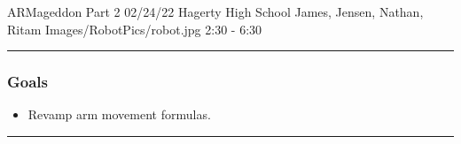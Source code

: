 \insertmeeting 
	{ARMageddon Part 2} 
	{02/24/22} 
	{Hagerty High School}
	{James, Jensen, Nathan, Ritam}
	{Images/RobotPics/robot.jpg}
	{2:30 - 6:30}
	
\noindent\hfil\rule{\textwidth}{.4pt}\hfil
\subsubsection*{Goals}
\begin{itemize}
    \item Revamp arm movement formulas.

\end{itemize} 

\noindent\hfil\rule{\textwidth}{.4pt}\hfil


